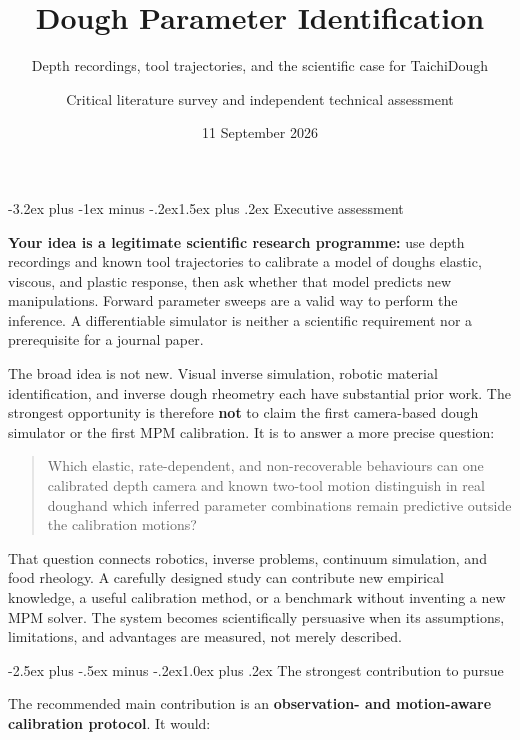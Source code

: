 \documentclass[
  11pt,
]{article}
\title{Dough Parameter Identification}
\subtitle{Depth recordings, tool trajectories, and the scientific case
for TaichiDough}
\author{Critical literature survey and independent technical assessment}
\date{11 September 2026}
\makeatletter
\renewcommand\section{\needspace{7\baselineskip}\@startsection{section}{1}{\z@}%
  {-3.2ex plus -1ex minus -.2ex}{1.5ex plus .2ex}%
  {\normalfont\sffamily\Large\bfseries\color{accent}}}
\renewcommand\subsection{\needspace{5\baselineskip}\@startsection{subsection}{2}{\z@}%
  {-2.5ex plus -.5ex minus -.2ex}{1.0ex plus .2ex}%
  {\normalfont\sffamily\large\bfseries\color{accent}}}
\let\reporttableofcontents\tableofcontents
\renewcommand{\tableofcontents}{\reporttableofcontents\clearpage}
\makeatother
\begin{document}
\maketitle

{
\hypersetup{linkcolor=}
\setcounter{tocdepth}{1}
\tableofcontents
}
\section{Executive assessment}\label{executive-assessment}

\textbf{Your idea is a legitimate scientific research programme:} use
depth recordings and known tool trajectories to calibrate a model of
dough\textquotesingle s elastic, viscous, and plastic response, then ask
whether that model predicts new manipulations. Forward parameter sweeps
are a valid way to perform the inference. A differentiable simulator is
neither a scientific requirement nor a prerequisite for a journal paper.

The broad idea is not new. Visual inverse simulation, robotic material
identification, and inverse dough rheometry each have substantial prior
work. The strongest opportunity is therefore \textbf{not} to claim the
first camera-based dough simulator or the first MPM calibration. It is
to answer a more precise question:

\begin{quote}
Which elastic, rate-dependent, and non-recoverable behaviours can one
calibrated depth camera and known two-tool motion distinguish in real
dough\textemdash{}\allowbreak{}and which inferred parameter combinations
remain predictive outside the calibration motions?
\end{quote}

That question connects robotics, inverse problems, continuum simulation,
and food rheology. A carefully designed study can contribute new
empirical knowledge, a useful calibration method, or a benchmark without
inventing a new MPM solver. The system becomes scientifically persuasive
when its assumptions, limitations, and advantages are measured, not
merely described.

\subsection{The strongest contribution to
pursue}\label{the-strongest-contribution-to-pursue}

The recommended main contribution is an \textbf{observation- and
motion-aware calibration protocol}. It would:
\end{document}
